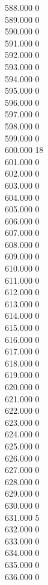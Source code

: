 { 588.000	0 \\
 589.000	0 \\
 590.000	0 \\
 591.000	0 \\
 592.000	0 \\
 593.000	0 \\
 594.000	0 \\
 595.000	0 \\
 596.000	0 \\
 597.000	0 \\
 598.000	0 \\
 599.000	0 \\
 600.000	18 \\
 601.000	0 \\
 602.000	0 \\
 603.000	0 \\
 604.000	0 \\
 605.000	0 \\
 606.000	0 \\
 607.000	0 \\
 608.000	0 \\
 609.000	0 \\
 610.000	0 \\
 611.000	0 \\
 612.000	0 \\
 613.000	0 \\
 614.000	0 \\
 615.000	0 \\
 616.000	0 \\
 617.000	0 \\
 618.000	0 \\
 619.000	0 \\
 620.000	0 \\
 621.000	0 \\
 622.000	0 \\
 623.000	0 \\
 624.000	0 \\
 625.000	0 \\
 626.000	0 \\
 627.000	0 \\
 628.000	0 \\
 629.000	0 \\
 630.000	0 \\
 631.000	5 \\
 632.000	0 \\
 633.000	0 \\
 634.000	0 \\
 635.000	0 \\
 636.000	0 \\
}

